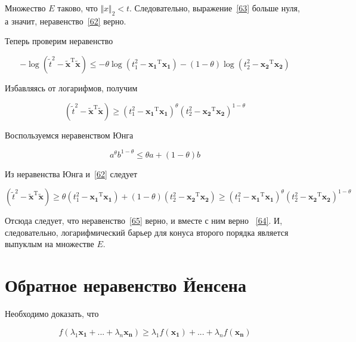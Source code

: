 	Множество $E$ таково, что $\Vert x \Vert_2 < t$. Следовательно,
	выражение~\eqref{63} больше нуля, а значит, неравенство~\eqref{62} верно.
	
	Теперь проверим неравенство
	
	\begin{equation}
	\label{64}
	-\log(\tilde{t}^2 - \mathbf{\tilde{x}}^\text{T} \mathbf{\tilde{x}}) \leqslant -
	\theta \log(t_1^2 - \mathbf{x_1}^\text{T} \mathbf{x_1}) - (1-\theta) \log(t_2^2
	- \mathbf{x_2}^\text{T} \mathbf{x_2})
	\end{equation}
	
	Избавляясь от логарифмов, получим
	
	\begin{equation}
	\label{65}
	(\tilde{t}^2 - \mathbf{\tilde{x}}^\text{T} \mathbf{\tilde{x}}) \geqslant (t_1^2
	- \mathbf{x_1}^\text{T} \mathbf{x_1})^{\theta} (t_2^2 - \mathbf{x_2}^\text{T}
	\mathbf{x_2})^{1-\theta}
	\end{equation}
	
	Воспользуемся неравенством Юнга
	
	\begin{equation}
	a^\theta b^{1-\theta} \leqslant \theta a + (1-\theta) b
	\end{equation}
	
	Из неравенства Юнга и~\eqref{62} следует
	
	\begin{equation}
	(\tilde{t}^2 - \mathbf{\tilde{x}}^\text{T} \mathbf{\tilde{x}})\geqslant \theta
	(t_1^2 - \mathbf{x_1}^\text{T} \mathbf{x_1}) + (1-\theta)(t_2^2 -
	\mathbf{x_2}^\text{T} \mathbf{x_2}) \geqslant (t_1^2 - \mathbf{x_1}^\text{T}
	\mathbf{x_1})^{\theta} (t_2^2 - \mathbf{x_2}^\text{T} \mathbf{x_2})^{1-\theta}
	\end{equation}
	
	Отсюда следует, что неравенство~\eqref{65} верно, и вместе с ним верно
	~\eqref{64}. И, следовательно, логарифмический барьер для конуса второго порядка
	является выпуклым на множестве $E$.
	
	\section{Обратное неравенство Йенсена}
	
	Необходимо доказать, что
	
	\begin{equation}
	f(\lambda_1 \mathbf{x_1} + ... + \lambda_n \mathbf{x_n} ) \geqslant \lambda_1
	f(\mathbf{x_1}) + ... + \lambda_n f(\mathbf{x_n})
	\end{equation}
	
